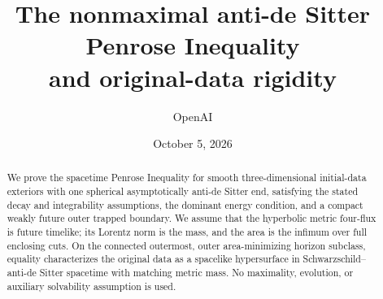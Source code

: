 \documentclass[11pt]{article}
\title{The nonmaximal anti-de Sitter Penrose Inequality\\and original-data rigidity}
\author{OpenAI}
\date{October 5, 2026}
\begin{document}
\maketitle
\begin{abstract}
We prove the spacetime Penrose Inequality for smooth three-dimensional initial-data exteriors with one spherical asymptotically anti-de Sitter end, satisfying the stated decay and integrability assumptions, the dominant energy condition, and a compact weakly future outer trapped boundary. We assume that the hyperbolic metric four-flux is future timelike; its Lorentz norm is the mass, and the area is the infimum over full enclosing cuts. On the connected outermost, outer area-minimizing horizon subclass, equality characterizes the original data as a spacelike hypersurface in Schwarzschild--anti-de Sitter spacetime with matching metric mass. No maximality, evolution, or auxiliary solvability assumption is used.
\end{abstract}
\tableofcontents












\appendix


\begingroup
\raggedright

\endgroup
\end{document}
